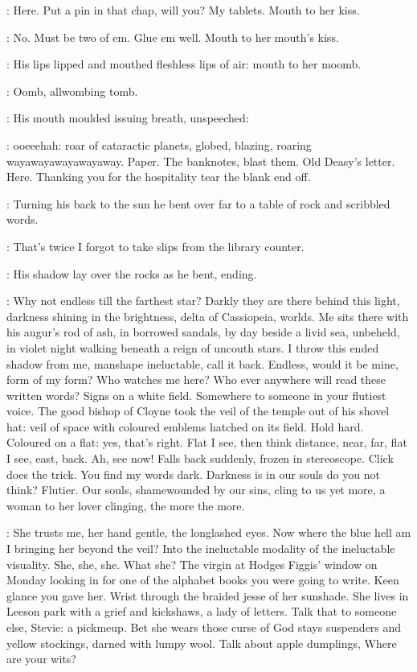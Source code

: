 \StephenInt:
Here.
Put a pin in that chap, will you?
My tablets.
Mouth to her kiss.

\StephenInt:
No.
Must be two of em.
Glue em well.
Mouth to her mouth's kiss.

:
His lips lipped and mouthed fleshless lips of air:
mouth to her moomb.

\StephenInt:
Oomb, allwombing tomb.

:
His mouth moulded issuing breath, unspeeched:

\StephenInt:
ooeeehah:
roar of cataractic planets, globed, blazing,
roaring wayawayawayawayaway.
Paper.
The banknotes, blast them.
Old Deasy's letter.
Here.
Thanking you for the hospitality tear the blank end off.

:
Turning his back to the sun
he bent over far to a table of rock and scribbled words.

\StephenInt:
That's twice I forgot to take slips from the library counter.

:
His shadow lay over the rocks as he bent, ending.

\StephenInt:
Why not endless till the farthest star?
Darkly they are there behind this light,
darkness shining in the brightness,
delta of Cassiopeia, worlds.
Me sits there with his augur's rod of ash,
in borrowed sandals,
by day beside a livid sea,
unbeheld, in violet night
walking beneath a reign of uncouth stars.
I throw this ended shadow from me, manshape ineluctable, call it back.
Endless, would it be mine, form of my form?
Who watches me here?
Who ever anywhere will read these written words?
Signs on a white field.
Somewhere to someone in your flutiest voice.
The good bishop of Cloyne took the veil of the temple
out of his shovel hat:
veil of space with coloured emblems
hatched on its field.
Hold hard.
Coloured on a flat:
yes, that's right.
Flat I see, then think distance,
near, far, flat I see, east, back.
Ah, see now!
Falls back suddenly, frozen in stereoscope.
Click does the trick.
You find my words dark.
Darkness is in our souls do you not think?
Flutier.
Our souls, shamewounded by our sins, cling to us yet more,
a woman to her lover clinging, the more the more.

\StephenInt:
She trusts me, her hand gentle, the longlashed eyes.
Now where the blue hell am I bringing her beyond the veil?
Into the ineluctable modality
of the ineluctable visuality.
She, she, she.
What she?
The virgin at Hodges Figgis' window on Monday looking in
for one of the alphabet books you were going to write.
Keen glance you gave her.
Wrist through the braided jesse of her sunshade.
She lives in Leeson park with a grief and kickshaws, a lady of letters.
Talk that to someone else,
Stevie:
a pickmeup.
Bet she wears those curse of God stays
suspenders and yellow stockings, darned with lumpy wool.
Talk about apple dumplings,
Where are your wits?

